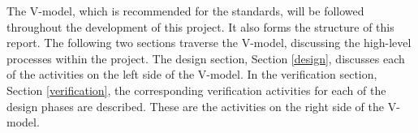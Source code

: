 

The V-model, which is recommended for the standards, will be followed throughout the development of this project. It also forms the structure of this report. The following two sections traverse the V-model, discussing the high-level processes within the project. The design section, Section \ref{design}, discusses each of the activities on the left side of the V-model. In the verification section, Section \ref{verification}, the corresponding verification activities for each of the design phases are described. These are the activities on the right side of the V-model.



